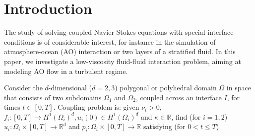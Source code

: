 \documentclass[10pt]{article}%
\numberwithin{equation}{section}
\begin{document}
\section{Introduction}

The study of solving coupled Navier-Stokes equations with special interface conditions
is of considerable interest, for instance in the simulation of atmosphere-ocean (AO)
interaction or two layers of a stratified fluid. In this paper, we investigate a low-viscosity fluid-fluid interaction problem, aiming at modeling AO flow in a turbulent regime.

Consider the $d$-dimensional ($d=2,3$) polygonal or polyhedral domain $\Omega$ in space that consists of two subdomains $\Omega_1$ and $\Omega_2$, coupled across an interface $I$, for times
$t\in [0,T]$. Coupling problem is: given  $ \nu_{i}>0 $, $f_{i}:[0,T]\rightarrow H^{1}(\Omega_{i})^d,u_{i}(0)\in
H^{1}(\Omega_{i})^d $ and $\kappa \in \mathbb{R} $, find (for $i=1,2$) $u_{i}:\Omega_{i}\times [0,T]\rightarrow \mathbb{R}^d$ and $p_{i}: \Omega_{i}\times [0,T]\rightarrow \mathbb{R}$ satisfying (for $0<t\leq T$)
\end{document}
